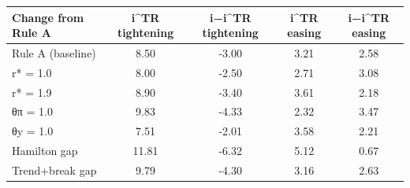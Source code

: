 \begin{tabular}{lcccc}
\toprule
Change from Rule A & i^TR tightening & i−i^TR tightening & i^TR easing & i−i^TR easing \\
\midrule
Rule A (baseline) & 8.50 & -3.00 & 3.21 & 2.58 \\
r* = 1.0 & 8.00 & -2.50 & 2.71 & 3.08 \\
r* = 1.9 & 8.90 & -3.40 & 3.61 & 2.18 \\
θπ = 1.0 & 9.83 & -4.33 & 2.32 & 3.47 \\
θy = 1.0 & 7.51 & -2.01 & 3.58 & 2.21 \\
Hamilton gap & 11.81 & -6.32 & 5.12 & 0.67 \\
Trend+break gap & 9.79 & -4.30 & 3.16 & 2.63 \\
\bottomrule
\end{tabular}
